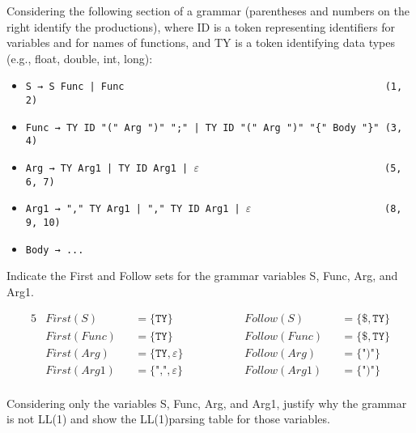 \documentclass[docid=2021]{comp_exam_round1}
\begin{document}
\setcounter{chapter}{2020}

\examgroup{}

Considering the following section of a grammar (parentheses and numbers on the right identify the productions), where ID is a token representing identifiers for variables and for names of functions, and TY is a token identifying data types (e.g., float, double, int, long):

\begin{itemize}[wide, noitemsep]
    \item \texttt{S → S Func | Func ~~~~~~~~~~~~~~~~~~~~~~~~~~~~~~~~~~~~~~~~~~~~(1, 2)}
    \item \texttt{Func → TY ID "(" Arg ")" ";" | TY ID "(" Arg ")" "\{" Body "\}" (3, 4)}
    \item \texttt{Arg → TY Arg1 | TY ID Arg1 | $\varepsilon$ ~~~~~~~~~~~~~~~~~~~~~~~~~~~~~~~(5, 6, 7)}
    \item \texttt{Arg1 → "," TY Arg1 | "," TY ID Arg1 | $\varepsilon$ ~~~~~~~~~~~~~~~~~~~~~~(8, 9, 10)}
    \item \texttt{Body → ...}
\end{itemize}

\question
Indicate the First and Follow sets for the grammar variables S, Func, Arg, and Arg1.

\ansseparator

\vspace{-2.0em}
\begin{alignat*}{5}
    & First(S   ) &&= \{ \texttt{TY}               \} && ~~~~~~~~~~ && Follow(S   ) &&= \{ \$, \texttt{TY} \} \\
    & First(Func) &&= \{ \texttt{TY}               \} && ~~~~~~~~~~ && Follow(Func) &&= \{ \$, \texttt{TY} \} \\
    & First(Arg ) &&= \{ \texttt{TY}, \varepsilon  \} && ~~~~~~~~~~ && Follow(Arg ) &&= \{ \texttt{")"}    \} \\
    & First(Arg1) &&= \{ \texttt{","}, \varepsilon \} && ~~~~~~~~~~ && Follow(Arg1) &&= \{ \texttt{")"}    \} \\
\end{alignat*}
\vspace{-3.0em}

\question
Considering only the variables S, Func, Arg, and Arg1, justify why the grammar is not LL(1) and show the LL(1)parsing table for those variables.

\ansseparator
\end{document}
